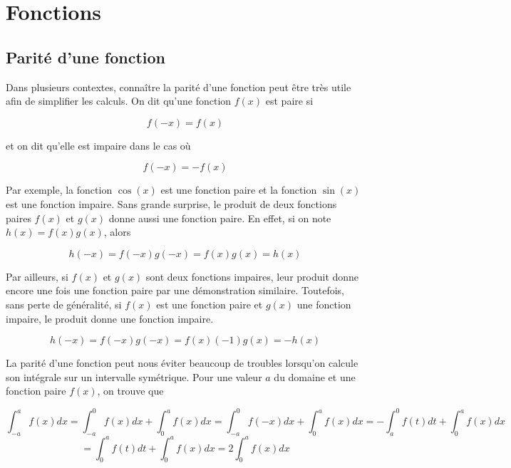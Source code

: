 \section{Fonctions}
\subsection{Parité d'une fonction}
Dans plusieurs contextes, connaître la parité d'une fonction peut être très utile afin de simplifier les calculs. On dit qu'une fonction $f(x)$ est paire si

\begin{equation}
    f(-x) = f(x)
\end{equation}

et on dit qu'elle est impaire dans le cas où

\begin{equation}
    f(-x) = -f(x)    
\end{equation}
  
Par exemple, la fonction $\cos(x)$ est une fonction paire et la fonction $\sin(x)$ est une fonction impaire. Sans grande surprise, le produit de deux fonctions paires $f(x)$ et $g(x)$ donne aussi une fonction paire. En effet, si on note $h(x) = f(x)g(x)$, alors

\begin{equation*}
    h(-x) = f(-x)g(-x) = f(x)g(x) = h(x)
\end{equation*}

Par ailleurs, si $f(x)$ et $g(x)$ sont deux fonctions impaires, leur produit donne encore une fois une fonction paire par une démonstration similaire. Toutefois, sans perte de généralité, si $f(x)$ est une fonction paire et $g(x)$ une fonction impaire, le produit donne une fonction impaire.

\begin{equation*}
    h(-x) = f(-x)g(-x) = f(x)(-1)g(x) = -h(x)
\end{equation*}

La parité d'une fonction peut nous éviter beaucoup de troubles lorsqu'on calcule son intégrale sur un intervalle symétrique. Pour une valeur $a$ du domaine et une fonction paire $f(x)$, on trouve que 

\begin{equation*}
    \int_{-a}^{a}f(x)dx = \int_{-a}^{0}f(x)dx + \int_{0}^{a}f(x)dx = \int_{-a}^{0}f(-x)dx + \int_{0}^{a}f(x)dx = -\int_{a}^{0}f(t)dt + \int_{0}^{a}f(x)dx
\end{equation*}
\begin{equation*}
    = \int_{0}^{a}f(t)dt + \int_{0}^{a}f(x)dx = 2\int_{0}^{a}f(x)dx
\end{equation*}

